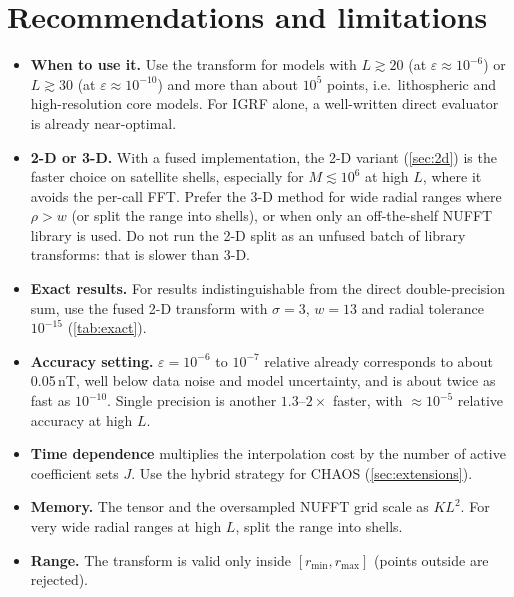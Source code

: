 \documentclass[11pt,a4paper]{article}
\theoremstyle{remark}
\newcommand{\eps}{\varepsilon}
\begin{document}
\section{Recommendations and limitations}\label{sec:limits}
\begin{itemize}
\item \textbf{When to use it.} Use the transform for models with $L\gtrsim20$ (at $\eps\approx10^{-6}$) or
  $L\gtrsim30$ (at $\eps\approx10^{-10}$) and more than about $10^5$ points, i.e.\ lithospheric and
  high-resolution core models. For IGRF alone, a well-written direct evaluator is already near-optimal.
\item \textbf{2-D or 3-D.} With a fused implementation, the 2-D variant (\cref{sec:2d}) is the faster choice
  on satellite shells, especially for $M\lesssim10^6$ at high $L$, where it avoids the per-call FFT. Prefer the 3-D method
  for wide radial ranges where $\rho>w$ (or split the range into shells), or when only an off-the-shelf NUFFT library is used.
  Do not run the 2-D split as an unfused batch of library transforms: that is slower than 3-D.
\item \textbf{Exact results.} For results indistinguishable from the direct double-precision sum, use the fused 2-D
  transform with $\sigma=3$, $w=13$ and radial tolerance $10^{-15}$ (\cref{tab:exact}).
\item \textbf{Accuracy setting.} $\eps=10^{-6}$ to $10^{-7}$ relative already corresponds to about 0.05\,nT,
  well below data noise and model uncertainty, and is about twice as fast as $10^{-10}$.
  Single precision is another $1.3$--$2\times$ faster, with $\approx10^{-5}$ relative accuracy at high $L$.
\item \textbf{Time dependence} multiplies the interpolation cost by the number of active
  coefficient sets $J$. Use the hybrid strategy for CHAOS (\cref{sec:extensions}).
\item \textbf{Memory.} The tensor and the oversampled NUFFT grid scale as $KL^2$. For very wide radial ranges at
  high $L$, split the range into shells.
\item \textbf{Range.} The transform is valid only inside $[r_{\min},r_{\max}]$ (points outside are rejected).
\end{itemize}

\end{document}
